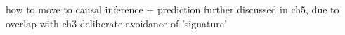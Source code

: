 \begin{outline}
\1 how to move to causal inference + prediction further discussed in ch5, due to overlap with ch3
    \2 deliberate avoidance of 'signature'




\end{outline}
